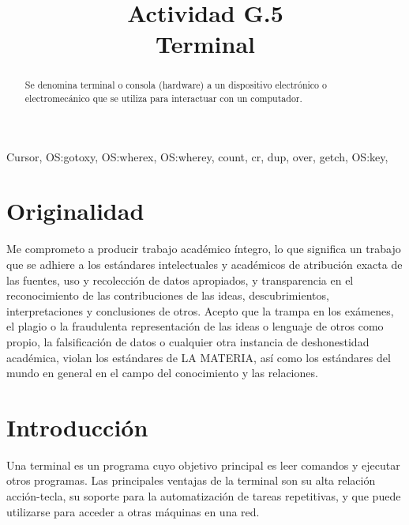 \documentclass[conference]{IEEEtran}
\begin{document}
\title{Actividad G.5 \\ Terminal }

\author{
 }
\onecolumn

\maketitle

\begin{abstract}
Se denomina terminal o consola (hardware) a un dispositivo electrónico o electromecánico que se utiliza para interactuar con un computador.
\end{abstract}

\begin{IEEEkeywords}
\begin{center}
Cursor, OS:gotoxy, OS:wherex, OS:wherey, count, cr, dup, over, getch, OS:key, 
\end{center}
\end{IEEEkeywords}

\section{Originalidad}
Me comprometo a producir trabajo académico íntegro, lo que significa un trabajo que se adhiere a los estándares intelectuales y académicos de atribución exacta de las fuentes, uso y recolección de datos apropiados, y transparencia en el reconocimiento de las contribuciones de las ideas, descubrimientos, interpretaciones y conclusiones de otros.
Acepto que la trampa en los exámenes, el plagio o la fraudulenta representación de las ideas o lenguaje de otros como propio, la falsificación de datos o cualquier otra instancia de deshonestidad académica, violan los estándares de LA MATERIA, así como los estándares del mundo en general en el campo del conocimiento y las relaciones.

\section{Introducción}
\begin{center}
Una terminal es un programa cuyo objetivo principal es leer comandos y ejecutar otros programas. Las principales ventajas de la terminal son su alta relación acción-tecla, su soporte para la automatización de tareas repetitivas, y que puede utilizarse para acceder a otras máquinas en una red.
\end{center}
\end{document}
